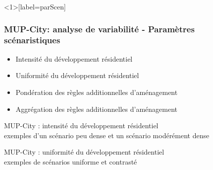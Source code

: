 \documentclass[xcolor=table]{beamer}
\begin{document}
\begin{frame}<1>[label=parScen]
\frametitle{MUP-City: analyse de variabilité - Paramètres scénaristiques}
	\begin{itemize}
		\item \alert<1>{Intensité du développement résidentiel}
		\item<2-> \alert<2>{Uniformité du développement résidentiel}
		\item<3-> \alert<3>{Pondération des règles additionnelles d'aménagement}
		\item<4> \alert<4>{Aggrégation des règles additionnelles d'aménagement}
	\end{itemize}
\end{frame}

\begin{frame}{MUP-City : intensité du développement résidentiel}
\vspace{1cm}
\\
{\footnotesize exemples d'un scénario peu dense et un scénario modérément dense}
\end{frame}


\begin{frame}{MUP-City : uniformité du développement résidentiel}
\vspace{1cm}
\\
{\footnotesize exemples de scénarios uniforme et contrasté}
\end{frame}
\end{document}
